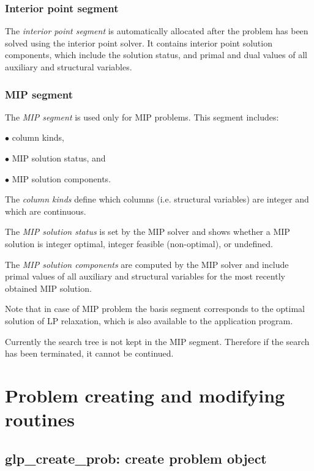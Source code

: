 \subsubsection*{Interior point segment}

The {\it interior point segment} is automatically allocated after the
problem has been solved using the interior point solver. It contains
interior point solution components, which include the solution status,
and primal and dual values of all auxiliary and structural variables.

\subsubsection*{MIP segment}

The {\it MIP segment} is used only for MIP problems. This segment
includes:

$\bullet$ column kinds,

$\bullet$ MIP solution status, and

$\bullet$ MIP solution components.

The {\it column kinds} define which columns (i.e. structural variables)
are integer and which are continuous.

The {\it MIP solution status} is set by the MIP solver and shows whether
a MIP solution is integer optimal, integer feasible (non-optimal), or
undefined.

The {\it MIP solution components} are computed by the MIP solver and
include primal values of all auxiliary and structural variables for the
most recently obtained MIP solution.

Note that in case of MIP problem the basis segment corresponds to
the optimal solution of LP relaxation, which is also available to the
application program.

Currently the search tree is not kept in the MIP segment. Therefore if
the search has been terminated, it cannot be continued.


\newpage

\section{Problem creating and modifying routines}

\subsection{glp\_create\_prob: create problem object}

